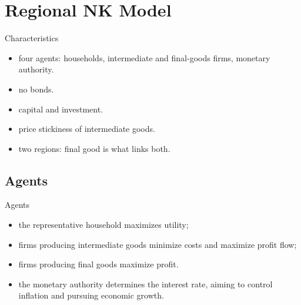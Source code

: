 \documentclass[../quali_slides.tex]{subfiles}
\begin{document}

\section{Regional NK Model}

\begin{frame}{Characteristics}
	
	\begin{itemize}
		
		\item four agents: households, intermediate and final-goods firms, monetary authority.
		
		\item no bonds.
		
		\item capital and investment.
		
		\item price stickiness of intermediate goods.
		
		\item two regions: final good is what links both.
		
	\end{itemize}
	
\end{frame}
	

	\subsection{Agents}
	
	\begin{frame}{Agents}

	\begin{itemize}
	
	\item the representative household maximizes utility;
	
	\item firms producing intermediate goods minimize costs and maximize profit flow;
	
	\item firms producing final goods maximize profit.

	\item the monetary authority determines the interest rate, aiming to control inflation and pursuing economic growth.
	
	\end{itemize}		

	\end{frame}
\end{document}
